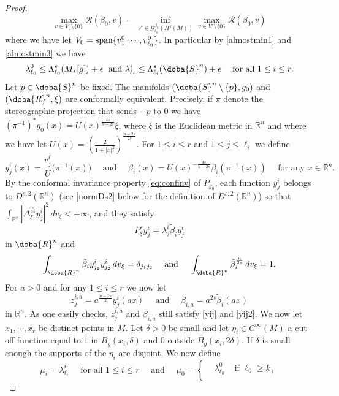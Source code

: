 \documentclass[10pt]{amsart}
\numberwithin{equation}{section}
\newcommand{\R}{\mathbb{R}}
\def\La{{\Lambda}}
\def\be{{\beta}}
\def\de{{\delta}}
\def\la{{\lambda}}
\def\ep{{\varepsilon}}
\gdef\mR{\doba{R}}
\gdef\mS{\doba{S}}
\def \ep{\epsilon}
\theoremstyle{plain}
\theoremstyle{remark}
\begin{document}
\begin{proof}
$$ \max_{v\in V_0\setminus\{0\}} \mathcal{R}(\be_0,v) = \inf_{V' \in \mathcal{G}^{\be_0}_{\ell_0}(H^s(M))}  \max_{v\in V' \setminus\{0\}} \mathcal{R}(\be_0,v) $$
where we have let $V_0=\hbox{span}\{v^0_1 \cdots, v^0_{\ell_0}\}$. In particular by \eqref{almostmin1} and \eqref{almostmin3} we have
\begin{equation} \label{laleq}
 \la_{\ell_0}^0 \leq \La_{\ell_0}^s(M,[g]) + \ep  \; \hbox{ and }  \la_{\ell_i}^i \leq \La_{\ell_i}^s(\mS^n)+\ep \quad \text{ for all } 1 \le i \le r.
\end{equation}
Let $p \in \mS^n$ be fixed. The manifolds $(\mS^n \setminus \{p\}, g_0)$ and $(\mR^n, \xi)$ are conformally equivalent. Precisely, if $\pi$ denote the stereographic projection that sends $-p$ to $0$ we have  $(\pi^{-1})^* g_0(x) = U(x)^{\frac{4s}{n-2s}} \xi$, where $\xi$ is the Euclidean metric in $\R^n$ and where we have let $ U(x) = \left(\frac{2}{1+|x|^2}\right)^{\frac{n-2s}{2s}}$. For $1 \le i \le r$ and $1 \le j \le \ell_i$ we define
$$ y_j^i (x) =  \frac{v_j^i }{U}\big( \pi^{-1}(x) \big) \quad \text{ and } \quad \tilde{\beta}_i(x) = U(x)^{-\frac{4s}{n-2s}} \beta_i(\pi^{-1}(x)) \quad \text{ for any } x \in \R^n.$$
By the conformal invariance property \eqref{eq:confinv} of $P_{g_0}$, each function $y_j^i$ belongs to $D^{s,2}(\R^n)$ (see  \eqref{normDs2} below
 for the definition of $D^{s,2}(\R^n)$) so that $\int_{\R^n} |\Delta_\xi^{\frac{s}{2s}} y_j^i |^2 \, dv_\xi < + \infty$, and they satisfy 
\begin{equation} \label{yij}
 P^s_{\xi} y_j^i = \la_j^i \tilde{\be}_i y_j^i 
\end{equation}
in $\mR^n$ and 
\begin{equation} \label{yij2} 
\int_{\mR^n} \tilde{\be}_i y_{j_1}^i y_{j_2}^i \, dv_\xi = \delta_{j_1 j_2} \quad  \hbox{ and } \quad  \int_{\mR^n} \tilde{\be}_i ^{\frac{n}{2s}}\,  dv_\xi =1.
\end{equation}
For $a>0$ and for any  $1 \le i \le r$ we now let 
$$z_j^{i,a}= a^{\frac{n-2s}{2}}  y_j^i(ax) \quad \text{ and } \quad \be_{i,a}= a^{2s} \tilde{\be}_i(ax) $$
in $\R^n$. As one easily checks, $z_j^{i,a}$ and $\be_{i,a}$ still satisfy \eqref{yij} and \eqref{yij2}. We now let $x_1,\cdots,x_r$ be distinct points in $M$. Let $\de >0$ be small and let $\eta_i \in C^{\infty}(M)$ a cut-off function equal to $1$ in $B_g(x_i,\de)$ and $0$ outside $B_g(x_i,2 \de)$. If $\de$ is small enough the supports of the $\eta_i$ are disjoint. We now define
\begin{equation} \label{defmui}
 \mu_i = \la_{\ell_i}^i \quad \text{ for all } 1 \le i \le r \quad \text{ and } \quad \mu_0=  \left \{ \begin{aligned} &  \la_{\ell_0}^0 &\text{ if } \ell_0 \ge k_+ \\

\end{aligned}
\end{equation}
\end{proof}
\end{document}
